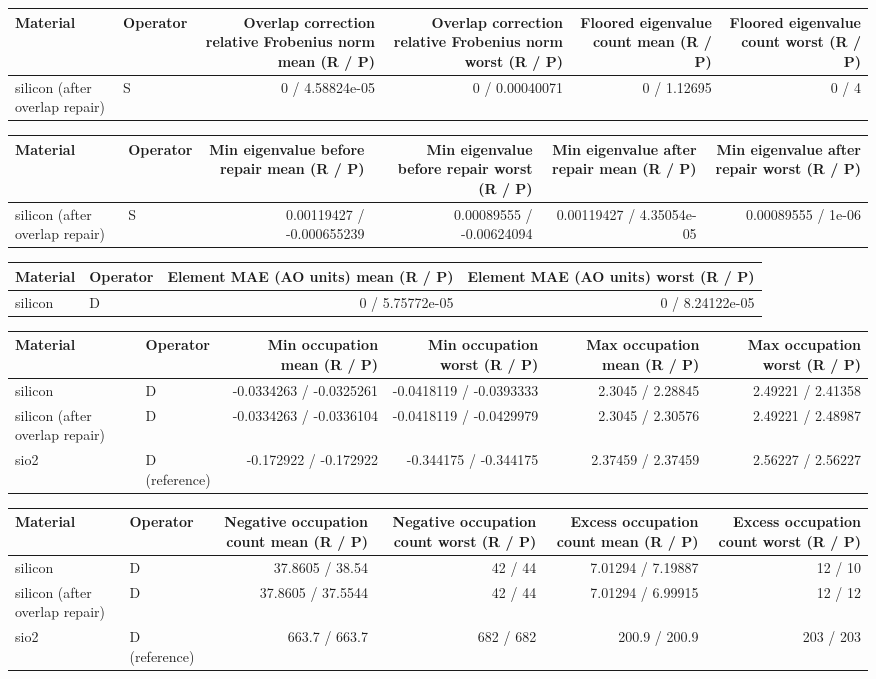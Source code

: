 \begin{tabular}{llrrrr}
\toprule
Material & Operator & Overlap correction relative Frobenius norm mean (R / P) & Overlap correction relative Frobenius norm worst (R / P) & Floored eigenvalue count mean (R / P) & Floored eigenvalue count worst (R / P) \\
\midrule
silicon (after overlap repair) & S & 0 / 4.58824e-05 & 0 / 0.00040071 & 0 / 1.12695 & 0 / 4 \\
\bottomrule
\end{tabular}
\begin{tabular}{llrrrr}
\toprule
Material & Operator & Min eigenvalue before repair mean (R / P) & Min eigenvalue before repair worst (R / P) & Min eigenvalue after repair mean (R / P) & Min eigenvalue after repair worst (R / P) \\
\midrule
silicon (after overlap repair) & S & 0.00119427 / -0.000655239 & 0.00089555 / -0.00624094 & 0.00119427 / 4.35054e-05 & 0.00089555 / 1e-06 \\
\bottomrule
\end{tabular}
\begin{tabular}{llrr}
\toprule
Material & Operator & Element MAE (AO units) mean (R / P) & Element MAE (AO units) worst (R / P) \\
\midrule
silicon & D & 0 / 5.75772e-05 & 0 / 8.24122e-05 \\
\bottomrule
\end{tabular}
\begin{tabular}{llrrrr}
\toprule
Material & Operator & Min occupation mean (R / P) & Min occupation worst (R / P) & Max occupation mean (R / P) & Max occupation worst (R / P) \\
\midrule
silicon & D & -0.0334263 / -0.0325261 & -0.0418119 / -0.0393333 & 2.3045 / 2.28845 & 2.49221 / 2.41358 \\
silicon (after overlap repair) & D & -0.0334263 / -0.0336104 & -0.0418119 / -0.0429979 & 2.3045 / 2.30576 & 2.49221 / 2.48987 \\
sio2 & D (reference) & -0.172922 / -0.172922 & -0.344175 / -0.344175 & 2.37459 / 2.37459 & 2.56227 / 2.56227 \\
\bottomrule
\end{tabular}
\begin{tabular}{llrrrr}
\toprule
Material & Operator & Negative occupation count mean (R / P) & Negative occupation count worst (R / P) & Excess occupation count mean (R / P) & Excess occupation count worst (R / P) \\
\midrule
silicon & D & 37.8605 / 38.54 & 42 / 44 & 7.01294 / 7.19887 & 12 / 10 \\
silicon (after overlap repair) & D & 37.8605 / 37.5544 & 42 / 44 & 7.01294 / 6.99915 & 12 / 12 \\
sio2 & D (reference) & 663.7 / 663.7 & 682 / 682 & 200.9 / 200.9 & 203 / 203 \\
\bottomrule
\end{tabular}
